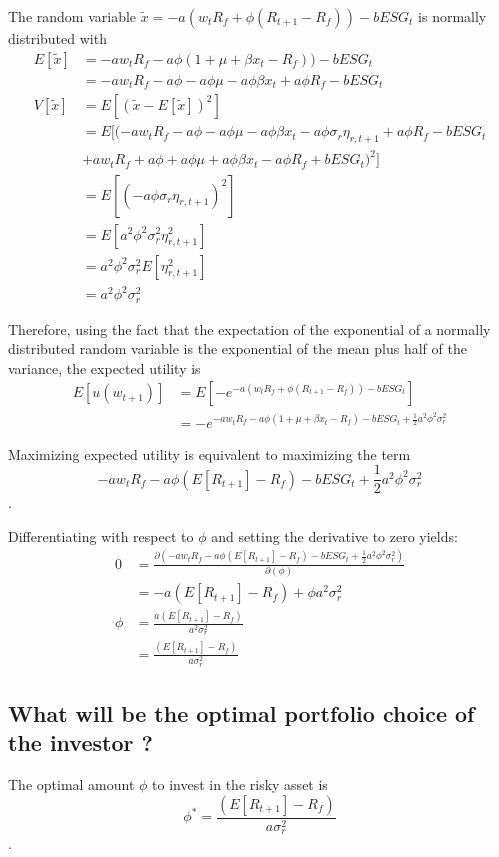 \documentclass[]{article}
\begin{document}
The random variable $\tilde{x} = -a(w_t R_f + \phi (R_{t+1} - R_f)) - bESG_t$ is normally distributed with 
\begin{align*}
	E[\tilde{x}] &= -aw_t R_f -a \phi (1+\mu+\beta x_t - R_f)) - bESG_t\\
	&= -aw_t R_f - a \phi - a \phi \mu - a \phi \beta x_t + a \phi R_f - bESG_t\\
	V[\tilde{x}] &= E[(\tilde{x} - E[\tilde{x}])^2]\\
	&= E[(-aw_t R_f - a \phi - a \phi \mu - a \phi \beta x_t - a \phi \sigma_r \eta_{r, t+1} + a \phi R_f - bESG_t \\
	&+ aw_t R_f + a \phi + a \phi \mu + a \phi \beta x_t - a \phi R_f + bESG_t)^2]\\
	&= E[(- a \phi \sigma_r \eta_{r, t+1})^2]\\
	&= E[a^2 \phi^2 \sigma_r^2 \eta_{r, t+1}^2]\\
	&= a^2 \phi^2 \sigma_r^2 E[\eta_{r, t+1}^2]\\
	&= a^2 \phi^2 \sigma_r^2
\end{align*}

Therefore, using the fact that the expectation of the exponential of a normally distributed random variable is the exponential of the mean plus half of the variance, the expected utility is
\begin{align*}
	E[u(w_{t+1})] &= E[-e^{-a(w_t R_f + \phi (R_{t+1} - R_f)) - bESG_t}]\\
	&= -e^{-aw_t R_f -a \phi (1+\mu+\beta x_t - R_f) - bESG_t + \frac{1}{2}a^2 \phi^2 \sigma_r^2}
\end{align*}

Maximizing expected utility is equivalent to maximizing the term $$-aw_t R_f -a \phi (E[R_{t+1}] - R_f) - bESG_t + \frac{1}{2}a^2 \phi^2 \sigma_r^2$$.

Differentiating with respect to $\phi$ and setting the derivative to zero yields: 
\begin{align*}
	0 &= \frac{\partial (-aw_t R_f -a \phi (E[R_{t+1}] - R_f) - bESG_t + \frac{1}{2}a^2 \phi^2 \sigma_r^2)}{\partial(\phi)}\\
	&= -a (E[R_{t+1}] - R_f) + \phi a^2 \sigma_r^2\\
	\phi &= \frac{a (E[R_{t+1}] - R_f)}{a^2 \sigma_r^2}\\
	&= \frac{(E[R_{t+1}] - R_f)}{a \sigma_r^2}
\end{align*}

\subsection{What will be the optimal portfolio choice of the investor ?}
The optimal amount $\phi$ to invest in the risky asset is $$\phi^* = \frac{(E[R_{t+1}] - R_f)}{a \sigma_r^2}$$.
\end{document}
